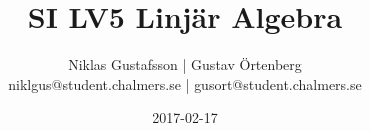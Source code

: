 \documentclass{article}
\title{SI LV5 Linjär Algebra}
\author{Niklas Gustafsson | Gustav Örtenberg  \\ \small{niklgus@student.chalmers.se} | \small{gusort@student.chalmers.se}}
\date{2017-02-17}
\begin{document}
\maketitle
\section{}


\section{}


\section{}


\section{}


\section{}


\section{}

\end{document}
